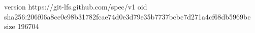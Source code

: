 version https://git-lfs.github.com/spec/v1
oid sha256:206f06a8cc0e98b31782fcae74d0e3d79e35b7737bcbc7d271a4cf68db5969bc
size 196704
